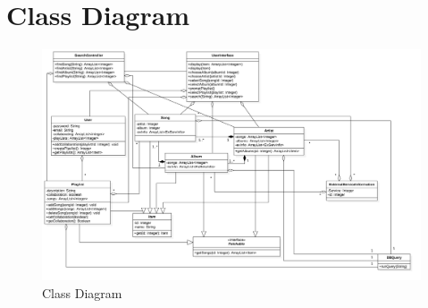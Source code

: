 \documentclass[12pt]{article}
\begin{document}
	\section{Class Diagram}
	\begin{figure}[H]
		\centering
		\includegraphics[scale=0.35]{MusicManagerClassDiagram.png}
		\caption{Class Diagram}
		\label{fig:classDiag}
	\end{figure}
	
\end{document}
